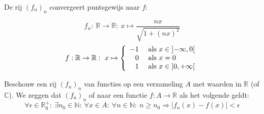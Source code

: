 \documentclass[main.tex]{subfiles}
\begin{document}
\begin{vb}
  De rij $(f_{n})_{n}$ convergeert puntsgewijs naar $f$:

  \noindent
  \begin{minipage}{.45\textwidth}
    \begin{figure}[H]
      \centering
    \end{figure}
  \end{minipage}
  \begin{minipage}{.45\textwidth}
  \[
  f_{n}:\ \mathbb{R} \rightarrow \mathbb{R}:\ x \mapsto \frac{nx}{\sqrt{1+(nx)^{2}}}
  \]
  \[
  f: \mathbb{R} \rightarrow \mathbb{R}:\ x \mapsto
  \left\{
    \begin{array}{rl}
      -1 & \text{ als } x \in \interval[open]{-\infty}{0}\\
      0  & \text{ als } x = 0\\
      1  & \text{ als } x \in \interval[open]{0}{+\infty}\\
    \end{array}
  \right.
  \]
  \end{minipage}
\end{vb}

\begin{de}
  Beschouw een rij $(f_{n})_{n}$ van functies op een verzameling $A$ met waarden in $\mathbb{R}$ (of $\mathbb{C}$).
  We zeggen dat $(f_{n})_{n}$  of  naar een functie $f: A \rightarrow \mathbb{R}$ als het volgende geldt:
  \[ \forall \epsilon \in \mathbb{R}_{0}^{+}:\ \exists n_{0} \in \mathbb{N}:\ \forall x \in A:\ \forall n\in \mathbb{N}:\ n \ge n_{0} \Rightarrow |f_{n}(x)-f(x)| < \epsilon \]
\end{de}
\end{document}
